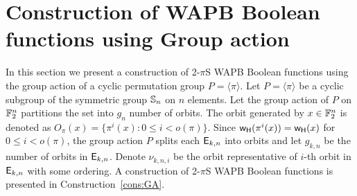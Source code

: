 \documentclass{llncs}
\begin{document}
\section{Construction of WAPB Boolean functions using Group action}\label{sec:GA}
In this section we present a construction of 2-$\pi$S WAPB Boolean functions using the group action of a cyclic permutation group $P = \langle \pi \rangle$. 
Let $P = \langle \pi \rangle$ be a cyclic subgroup of the symmetric group $\mathbb{S}_n$ on $n$ elements. Let the group action of $P$ on $\mathbb{F}_2^n$ partitions the set into $g_n$ number of orbits. 
The orbit generated by $x \in \mathbb{F}_2^n$ is denoted as $O_\pi(x) = \{\pi^i(x) : 0 \leq i < o(\pi)\}$. 
Since $\mathsf{w_H}(\pi^{i}(x)) = \mathsf{w_H}(x)$ for $0 \leq i < o(\pi)$, the group action $P$ splits each $\mathsf{E}_{k,n}$ into orbits and let $g_{k,n}$ be the number of orbits in $\mathsf{E}_{k,n}$.
Denote $\nu_{k,n,i}$ be the orbit representative of $i$-th orbit in $\mathsf{E}_{k,n}$ with some ordering.
A construction of 2-$\pi$S WAPB Boolean functions is presented in Construction~\ref{cons:GA}.
 
\end{document}
